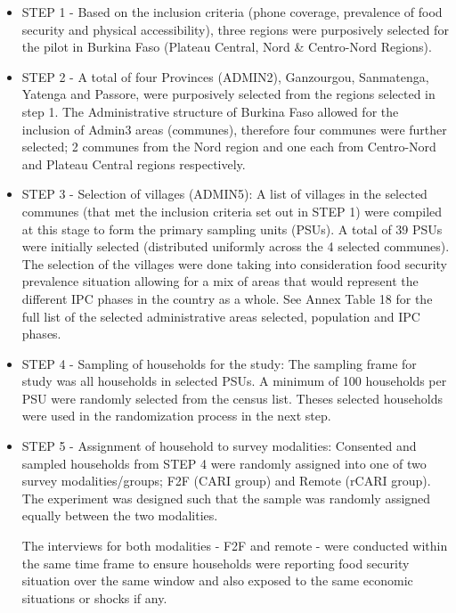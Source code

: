 \documentclass[11pt,harvard]{article}
\begin{document}
	\begin{itemize}[label=--, left=1.5em]
		\item[1.] STEP 1 - Based on the inclusion criteria (phone coverage, prevalence of food security and physical accessibility), three regions were purposively selected for the pilot in Burkina Faso (Plateau Central, Nord \& Centro-Nord Regions). 
		
		\item[2.] STEP 2 - A total of four Provinces (ADMIN2), Ganzourgou, Sanmatenga, Yatenga and Passore, were purposively selected from the regions selected in step 1. The Administrative structure of Burkina Faso allowed for the inclusion of Admin3 areas (communes), therefore four communes were further selected; 2 communes from the Nord region and one each from Centro-Nord and Plateau Central regions respectively. 
		
		\item[3.] STEP 3 - Selection of villages (ADMIN5): A list of villages in the selected communes (that met the inclusion criteria set out in STEP 1) were compiled at this stage to form the primary sampling units (PSUs). A total of 39 PSUs were initially selected (distributed uniformly across the 4 selected communes). The selection of the villages were done taking into consideration food security prevalence situation allowing for a mix of areas  that would represent the different IPC phases in the country as a whole. See Annex Table 18 for the full list of the selected administrative areas selected, population and IPC phases.
		
		\item[4.] STEP 4 - Sampling of households for the study: The sampling frame for study was all households in selected PSUs. A minimum of 100 households per PSU were randomly selected from the census list. Theses selected households were used in the randomization process in the next step.
		
		\item[5.] STEP 5 - Assignment of household to survey modalities: Consented and sampled households from STEP 4 were randomly assigned into one of two survey modalities/groups; F2F (CARI group) and Remote (rCARI group). The experiment was designed such that the sample was randomly assigned equally between the two modalities.
	
		The interviews for both modalities - F2F and remote - were conducted within the same time frame to ensure households were reporting food security situation over the same window and also exposed to the same economic situations or shocks if any. 
	\end{itemize}
	
\end{document}
